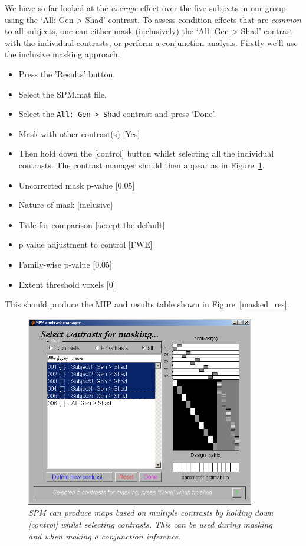 We have so far looked at the {\em average} effect over the five subjects in our group using the `All: Gen > Shad' contrast.
To assess condition effects that are {\em common} to all subjects, one can either mask (inclusively) the `All: Gen > Shad' contrast with the individual contrasts, or perform a conjunction analysis. Firstly we'll use the inclusive masking
approach.
\begin{itemize}
\item{Press the 'Results' button.}
\item{Select the SPM.mat file.}
\item{Select the \verb!All: Gen > Shad! contrast and press `Done'.}
\item{Mask with other contrast(s) [Yes]}
\item{Then hold down the [control] button whilst selecting all the individual contrasts. The contrast manager should then appear as in Figure~\ref{masked_con}.}
\item{Uncorrected mask p-value [0.05]}
\item{Nature of mask [inclusive]}
\item{Title for comparison [accept the default]}
\item{p value adjustment to control [FWE]}
\item{Family-wise p-value [0.05]}
\item{Extent threshold {voxels} [0]}
\end{itemize}
This should produce the MIP and results table shown in Figure~\ref{masked_res}.
\begin{figure}
\begin{center}
\includegraphics[width=100mm]{pet/masked_con}
\caption{\em SPM can produce maps based on multiple contrasts by holding down [control] whilst selecting contrasts. This can be used during masking and when making a conjunction inference. \label{masked_con}}
\end{center}
\end{figure}

